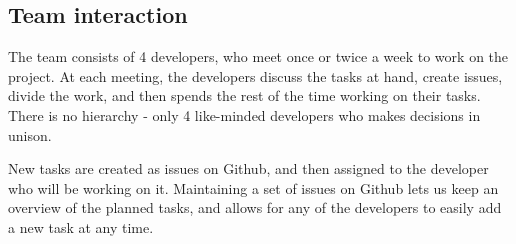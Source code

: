 \subsection{Team interaction}

The team consists of 4 developers, who meet once or twice a week to work on the project. At each meeting, the developers discuss the tasks at hand, create issues, divide the work, and then spends the rest of the time working on their tasks. There is no hierarchy - only 4 like-minded developers who makes decisions in unison.

New tasks are created as issues on Github, and then assigned to the developer who will be working on it. Maintaining a set of issues on Github lets us keep an overview of the planned tasks, and allows for any of the developers to easily add a new task at any time.
